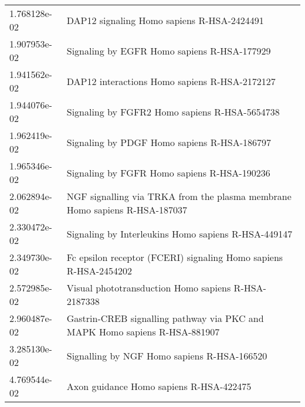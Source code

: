 \begin{longtable}{p{2.4cm}p{14.5cm}}
             1.768128e-02 &                                                    DAP12 signaling Homo sapiens R-HSA-2424491 \\
             1.907953e-02 &                                                   Signaling by EGFR Homo sapiens R-HSA-177929 \\
             1.941562e-02 &                                                 DAP12 interactions Homo sapiens R-HSA-2172127 \\
             1.944076e-02 &                                                 Signaling by FGFR2 Homo sapiens R-HSA-5654738 \\
             1.962419e-02 &                                                   Signaling by PDGF Homo sapiens R-HSA-186797 \\
             1.965346e-02 &                                                   Signaling by FGFR Homo sapiens R-HSA-190236 \\
             2.062894e-02 &                    NGF signalling via TRKA from the plasma membrane Homo sapiens R-HSA-187037 \\
             2.330472e-02 &                                           Signaling by Interleukins Homo sapiens R-HSA-449147 \\
             2.349730e-02 &                              Fc epsilon receptor (FCERI) signaling Homo sapiens R-HSA-2454202 \\
             2.572985e-02 &                                           Visual phototransduction Homo sapiens R-HSA-2187338 \\
             2.960487e-02 &                    Gastrin-CREB signalling pathway via PKC and MAPK Homo sapiens R-HSA-881907 \\
             3.285130e-02 &                                                   Signalling by NGF Homo sapiens R-HSA-166520 \\
             4.769544e-02 &                                                       Axon guidance Homo sapiens R-HSA-422475 \\
\end{longtable}


